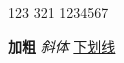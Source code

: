\documentclass[varwidth]{standalone}
\begin{document}
123 321 1234567

\textbf{加粗} \textit{斜体} \underline{下划线}
\end{document}
